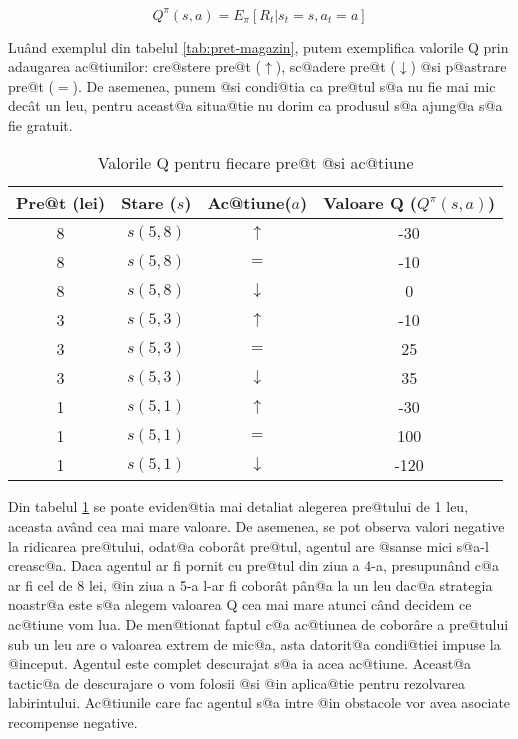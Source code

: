 \begin{equation}
	Q^{\pi}(s, a) = E_{\pi} \left[ R_t | s_t = s, a_t = a \right]
\end{equation}

Lu\^and exemplul din tabelul \ref{tab:pret-magazin}, putem exemplifica valorile Q prin adaugarea ac@tiunilor: cre@stere pre@t ($\uparrow$), sc@adere pre@t ($\downarrow$) @si p@astrare pre@t ($=$). De asemenea, punem @si condi@tia ca pre@tul s@a nu fie mai mic dec\^at un leu, pentru aceast@a situa@tie nu dorim ca produsul s@a ajung@a s@a fie gratuit.

\begin{table}[h]
	\begin{center}
		\begin{tabular}{|c|c|c|c|}
			\hline
			Pre@t (lei) & Stare ($s$) & Ac@tiune($a$) & Valoare Q ($Q^{\pi}(s, a)$) \\
			\hline
			8 & $s(5,8)$ & $\uparrow$ & -30 \\ 
			\hline
			8 & $s(5,8)$ & $=$ & -10 \\
			\hline
			8 & $s(5,8)$ & $\downarrow$ & 0 \\
			\hline
			3 & $s(5,3)$ & $\uparrow$ & -10 \\ 
			\hline
			3 & $s(5,3)$ & $=$ & 25 \\
			\hline
			3 & $s(5,3)$ & $\downarrow$ & 35 \\
			\hline
			1 & $s(5,1)$ & $\uparrow$ & -30 \\ 
			\hline
			1 & $s(5,1)$ & $=$ & 100 \\
			\hline
			1 & $s(5,1)$ & $\downarrow$ & -120 \\
			\hline
		\end{tabular}
	\end{center}
	\caption{Valorile Q pentru fiecare pre@t @si ac@tiune}
	\label{tab:pret-magazin-q}
\end{table}

Din tabelul \ref{tab:pret-magazin-q} se poate eviden@tia mai detaliat alegerea pre@tului de 1 leu, aceasta av\^and cea mai mare valoare. De asemenea, se pot observa valori negative la ridicarea pre@tului, odat@a cobor\^ at pre@tul, agentul are @sanse mici s@a-l creasc@a. Daca agentul ar fi pornit cu pre@tul din ziua a 4-a, presupun\^ and c@a ar fi cel de 8 lei, @in ziua a 5-a l-ar fi cobor\^ at p\^ an@a la un leu dac@a strategia noastr@a este s@a alegem valoarea Q cea mai mare atunci c\^and decidem ce ac@tiune vom lua. De men@tionat faptul c@a ac@tiunea de cobor\^ are a pre@tului sub un leu are o valoarea extrem de mic@a, asta datorit@a condi@tiei impuse la @inceput. Agentul este complet descurajat s@a ia acea ac@tiune. Aceast@a tactic@a de descurajare o vom folosii @si @in aplica@tie pentru rezolvarea labirintului. Ac@tiunile care fac agentul s@a intre @in obstacole vor avea asociate recompense negative.

